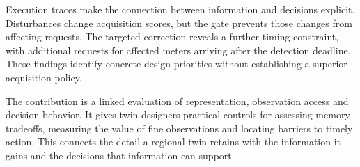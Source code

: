 \documentclass[conference]{IEEEtran}
\begin{document}
Execution traces make the connection between information and decisions explicit. Disturbances change acquisition scores, but the gate prevents those changes from affecting requests. The targeted correction reveals a further timing constraint, with additional requests for affected meters arriving after the detection deadline. These findings identify concrete design priorities without establishing a superior acquisition policy.

The contribution is a linked evaluation of representation, observation access and decision behavior. It gives twin designers practical controls for assessing memory tradeoffs, measuring the value of fine observations and locating barriers to timely action. This connects the detail a regional twin retains with the information it gains and the decisions that information can support.







\end{document}
